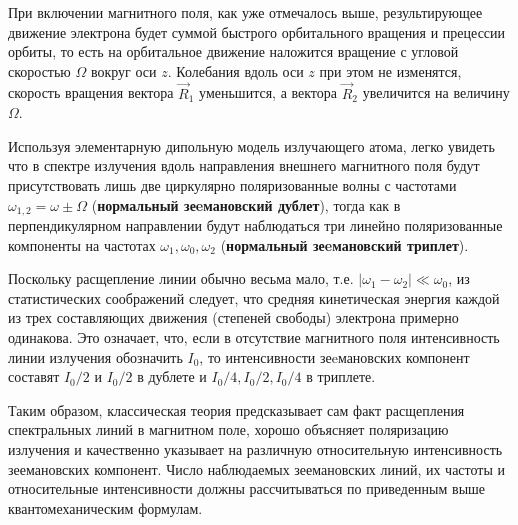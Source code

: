 При включении магнитного поля, как уже отмечалось выше, результирующее движение электрона будет суммой быстрого орбитального вращения и прецессии орбиты, то есть на орбитальное движение наложится вращение с угловой скоростью $\Omega$ вокруг оси $z$. Колебания вдоль оси $z$ при этом не изменятся, скорость вращения вектора $\vec{R}_1$ уменьшится, а вектора $\vec{R}_2$ увеличится на величину $\Omega$. 

Используя элементарную дипольную модель излучающего атома, легко увидеть что в спектре излучения вдоль направления внешнего магнитного поля будут присутствовать лишь две циркулярно поляризованные волны с частотами $\omega_{1,2}=\omega \pm \Omega$ (\textbf{нормальный зеeмановский дублет}), тогда как в перпендикулярном направлении будут наблюдаться три линейно поляризованные компоненты на частотах $\omega_1, \omega_0, \omega_2$ (\textbf{нормальный зеeмановский триплет}).

Поскольку расщепление линии обычно весьма мало, т.е. $|\omega_1 - \omega_2|\ll \omega_0$, из статистических соображений следует, что средняя кинетическая энергия каждой из трех составляющих движения (степеней свободы) электрона примерно одинакова. Это означает, что, если в отсутствие магнитного поля интенсивность линии излучения обозначить $I_0$, то интенсивности зеeмановских компонент составят $I_0/2$ и $I_0/2$ в дублете и $I_0/4, I_0/2, I_0/4$ в триплете. 

Таким образом, классическая теория предсказывает сам факт расщепления спектральных линий в магнитном поле, хорошо объясняет поляризацию излучения и качественно указывает на различную относительную интенсивность зеемановских компонент.
Число наблюдаемых зеемановских линий, их частоты и относительные интенсивности должны рассчитываться по приведенным выше квантомеханическим формулам.


